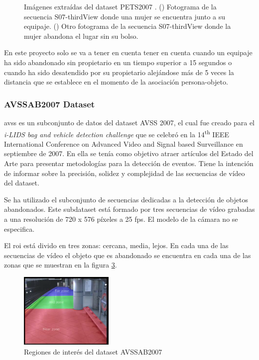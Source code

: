 \begin{figure}[ht]
\begin{subfigure}[b]{0.4\textwidth}
    \caption{}
    \label{fig:pets2007_4}
  \end{subfigure}
  \caption{Imágenes extraídas del dataset PETS2007 \cite{pets2007-dataset}.
    (\protect{}) Fotograma de la secuencia S07-thirdView donde una mujer se encuentra junto a su equipaje.
    (\protect{}) Otro fotograma de la secuencia S07-thirdView donde la mujer abandona el lugar sin su bolso.}
  \label{fig:pets2007_S07}
\end{figure}

En este proyecto solo se va a tener en cuenta tener en cuenta cuando un equipaje ha sido abandonado sin propietario en un tiempo superior a 15 segundos o cuando ha sido desatendido por su propietario alejándose más de 5 veces la distancia que se establece en el momento de la asociación persona-objeto.

\subsubsection{AVSSAB2007 Dataset}

\gls{avss} \cite{AVSSAB2007-dataset} es un subconjunto de datos del dataset AVSS 2007, el cual fue creado para el \textit{i-LIDS bag and vehicle detection challenge} que se celebró en la 14\textsuperscript{th} IEEE International Conference on Advanced Video and Signal based Surveillance en septiembre de 2007. En ella se tenía como objetivo atraer artículos del Estado del Arte para presentar metodologías para la detección de eventos. Tiene la intención de informar sobre la precisión, solidez y complejidad de las secuencias de vídeo del dataset.

Se ha utilizado el subconjunto de secuencias dedicadas a la detección de objetos abandonados. Este subdataset está formado por tres secuencias de vídeo grabadas a una resolución de 720 x 576 píxeles a 25 \gls{fps}. El modelo de la cámara no se especifica.

El \gls{roi} está divido en tres zonas: cercana, media, lejos. En cada una de las secuencias de vídeo el objeto que es abandonado se encuentra en cada una de las zonas que se muestran en la figura \ref{fig:avssab2007-zones}.

\begin{figure}[ht]
\centering
\includegraphics[width=0.4\textwidth]{img/chapters/resultados/datasets/avssab2007-zones.png}
\caption{\label{fig:avssab2007-zones}Regiones de interés del dataset AVSSAB2007}
\end{figure}

